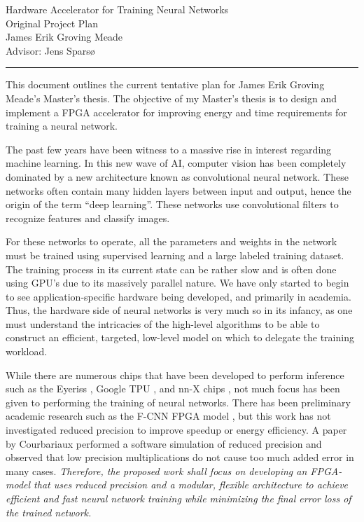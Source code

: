 	\begin{center}
		\Large {Hardware Accelerator for Training Neural Networks}\\
		\large
		Original Project Plan \\
		James Erik Groving Meade\\
		Advisor: Jens Sparsø
		\hrule
		\bigskip
	\end{center}
\normalsize 

This document outlines the current tentative plan for James Erik Groving Meade's Master's thesis. The objective of my Master's thesis is to design and implement a FPGA accelerator for improving energy and time requirements for training a neural network.
\par 
The past few years have been witness to a massive rise in interest regarding machine learning. In this new wave of AI, computer vision has been completely dominated by a new architecture known as convolutional neural network. These networks often contain many hidden layers between input and output, hence the origin of the term ``deep learning''. These networks use convolutional filters to recognize features and classify images.
\par 
For these networks to operate, all the parameters and weights in the network must be trained using supervised learning and a large labeled training dataset. The training process in its current state can be rather slow and is often done using GPU's due to its massively parallel nature. We have only started to begin to see application-specific hardware being developed, and primarily in academia. Thus, the hardware side of neural networks is very much so in its infancy, as one must understand the intricacies of the high-level algorithms to be able to construct an efficient, targeted, low-level model on which to delegate the training workload.
\par 
While there are numerous chips that have been developed to perform inference such as the Eyeriss \cite{eyeriss}, Google TPU \cite{tpu}, and nn-X chips \cite{nnx}, not much focus has been given to performing the training of neural networks. There has been preliminary academic research such as the F-CNN FPGA model \cite{fcnn}, but this work has not investigated reduced precision to improve speedup or energy efficiency. A paper by Courbariaux performed a software simulation of reduced precision and observed that low precision multiplications do not cause too much added error in many cases. \emph{Therefore, the proposed work shall focus on developing an FPGA-model that uses reduced precision and a modular, flexible architecture to achieve efficient and fast neural network training while minimizing the final error loss of the trained network.}
